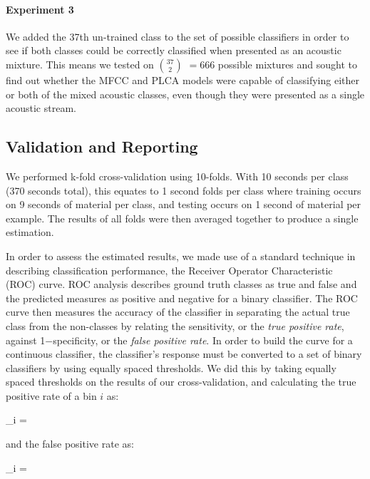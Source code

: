 \documentclass[a4paper,10pt,final]{ThesisStyle}
\begin{document}
\paragraph{Experiment 3}
We added the 37th un-trained class to the set of possible classifiers in order to see if both classes could be correctly classified when presented as an acoustic mixture.  This means we tested on $37\choose2$ $= 666$ possible mixtures and sought to find out whether the MFCC and PLCA models were capable of classifying either or both of the mixed acoustic classes, even though they were presented as a single acoustic stream.

\subsection{Validation and Reporting}
\label{sec:ROC}
We performed k-fold cross-validation using 10-folds.  With 10 seconds per class (370 seconds total), this equates to 1 second folds per class where training occurs on 9 seconds of material per class, and testing occurs on 1 second of material per example. The results of all folds were then averaged together to produce a single estimation.

In order to assess the estimated results, we made use of a standard technique in describing classification performance, the Receiver Operator Characteristic (ROC) curve.  ROC analysis describes ground truth classes as true and false and the predicted measures as positive and negative for a binary classifier.  The ROC curve then measures the accuracy of the classifier in separating the actual true class from the non-classes by relating the sensitivity, or the \textit{true positive rate}, against 1$-$specificity, or the \textit{false positive rate}.   In order to build the curve for a continuous classifier, the classifier's response must be converted to a set of binary classifiers by using equally spaced thresholds.  We did this by taking equally spaced thresholds on the results of our cross-validation, and calculating the true positive rate of a bin $i$ as: 

\begin{equationb}
_i = 
\end{equationb}

and the false positive rate as: 

\begin{equationb}
_i = 
\end{equationb}
\end{document}
